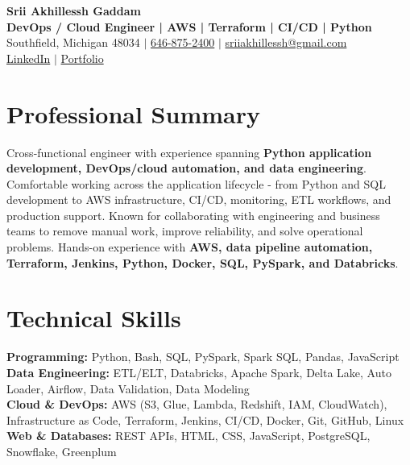 \documentclass[letterpaper,10pt]{article}
\begin{document}
\fontsize{9.35pt}{10.45pt}\selectfont

\begin{center}
    {\LARGE \textbf{Srii Akhillessh Gaddam}} \\[-1pt]
    \textbf{DevOps / Cloud Engineer | AWS | Terraform | CI/CD | Python} \\[2pt]
    Southfield, Michigan 48034 $|$
    \href{tel:6468752400}{646-875-2400} $|$
    \href{mailto:sriiakhillessh@gmail.com}{sriiakhillessh@gmail.com} \\[1pt]
    \href{https://www.linkedin.com/in/srii-akhiilessh-gaddam-b48668191/}{LinkedIn} $|$
    \href{https://sriiakhillesshg.github.io/portfolio/}{Portfolio}
\end{center}
\vspace{-8pt}

\section{Professional Summary}
\small{Cross-functional engineer with experience spanning \textbf{Python application development, DevOps/cloud automation, and data engineering}. Comfortable working across the application lifecycle - from Python and SQL development to AWS infrastructure, CI/CD, monitoring, ETL workflows, and production support. Known for collaborating with engineering and business teams to remove manual work, improve reliability, and solve operational problems. Hands-on experience with \textbf{AWS, data pipeline automation, Terraform, Jenkins, Python, Docker, SQL, PySpark, and Databricks}.}

\section{Technical Skills}
\small{
\textbf{Programming:} Python, Bash, SQL, PySpark, Spark SQL, Pandas, JavaScript \\
\textbf{Data Engineering:} ETL/ELT, Databricks, Apache Spark, Delta Lake, Auto Loader, Airflow, Data Validation, Data Modeling \\
\textbf{Cloud \& DevOps:} AWS (S3, Glue, Lambda, Redshift, IAM, CloudWatch), Infrastructure as Code, Terraform, Jenkins, CI/CD, Docker, Git, GitHub, Linux \\
\textbf{Web \& Databases:} REST APIs, HTML, CSS, JavaScript, PostgreSQL, Snowflake, Greenplum
}
\end{document}
